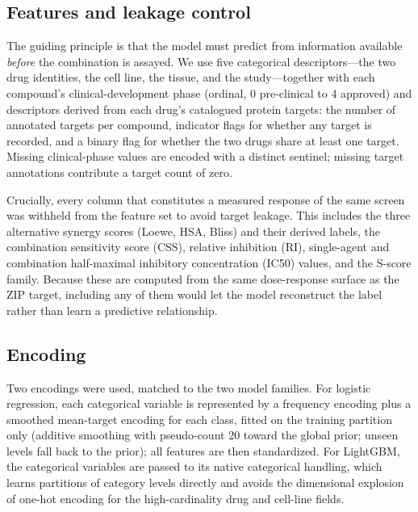 \documentclass{bmcart}
\begin{document}
\subsection*{Features and leakage control}
The guiding principle is that the model must predict from information available \emph{before} the
combination is assayed. We use five categorical descriptors---the two drug identities, the cell line,
the tissue, and the study---together with each compound's clinical-development phase (ordinal,
$0$ pre-clinical to $4$ approved) and descriptors derived from each drug's catalogued protein targets:
the number of annotated targets per compound, indicator flags for whether any target is recorded, and
a binary flag for whether the two drugs share at least one target. Missing clinical-phase values are
encoded with a distinct sentinel; missing target annotations contribute a target count of zero.

Crucially, every column that constitutes a measured response of the same screen was withheld from the
feature set to avoid target leakage. This includes the three alternative synergy scores (Loewe, HSA,
Bliss) and their derived labels, the combination sensitivity score (CSS), relative inhibition (RI),
single-agent and combination half-maximal inhibitory concentration (IC50) values, and the S-score
family. Because these are computed from the same dose-response surface as the ZIP target, including any
of them would let the model reconstruct the label rather than learn a predictive relationship.

\subsection*{Encoding}
Two encodings were used, matched to the two model families. For logistic regression, each categorical
variable is represented by a frequency encoding plus a smoothed mean-target encoding for each class,
fitted on the training partition only (additive smoothing with pseudo-count $20$ toward the global
prior; unseen levels fall back to the prior); all features are then standardized. For LightGBM, the
categorical variables are passed to its native categorical handling, which learns partitions of
category levels directly and avoids the dimensional explosion of one-hot encoding for the
high-cardinality drug and cell-line fields.
\end{document}
